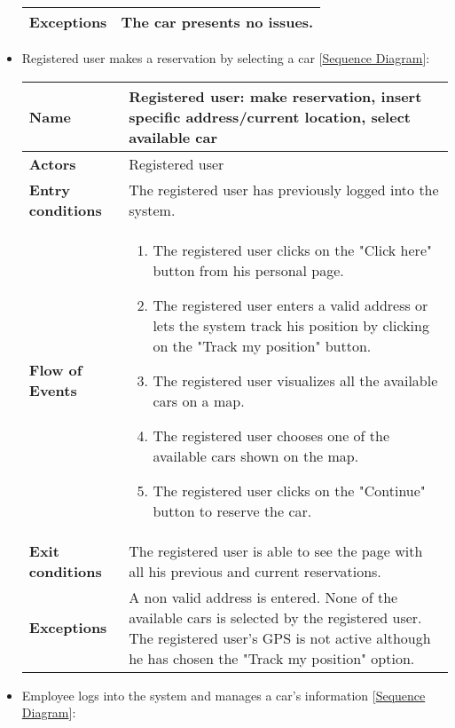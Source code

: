 \begin{itemize}
\begin{table}[H]
\begin{tabular}{| m{3.5cm} | m{9.5cm} |}
		\hline
		\textbf{Exceptions} & The car presents no issues.\\
		\hline
	\end{tabular}
\end{table}
\newpage
\item Registered user makes a reservation by selecting a car [\hyperlink{Reservation}{Sequence Diagram}]:
\begin{table}[H]
	\centering
	\begin{tabular}{| m{3.5cm} | m{9.5cm} |}
		\hline
		\textbf{Name} & Registered user: make reservation, insert specific address/current location, select available car\\
		\hline
		\textbf{Actors} & Registered user\\
		\hline
		\textbf{Entry conditions} & The registered user has previously logged into the system.\\
		\hline
		\textbf{Flow of Events} & 
		\begin{enumerate}
			\item The registered user clicks on the "Click here" button from his personal page.
			\item The registered user enters a valid address or lets the system track his position by clicking on the "Track my position" button.
			\item The registered user visualizes all the available cars on a map.
			\item The registered user chooses one of the available cars shown on the map.
			\item The registered user clicks on the "Continue" button to reserve the car.   
		\end{enumerate} \\
		\hline
		\textbf{Exit conditions} & The registered user is able to see the page with all his previous and current reservations.\\
		\hline
		\textbf{Exceptions} & A non valid address is entered. None of the available cars is selected by the registered user. The registered user's GPS is not active although he has chosen the "Track my position" option.\\
		\hline
	\end{tabular}
\end{table}
\newpage
\item Employee logs into the system and manages a car's information [\hyperlink{EmployeeManageCarInfo}{Sequence Diagram}]:
\begin{table}[H]
	\centering
	\begin{tabular}{| m{3.5cm} | m{9.5cm} |}

\end{tabular}
\end{table}
\end{itemize}
